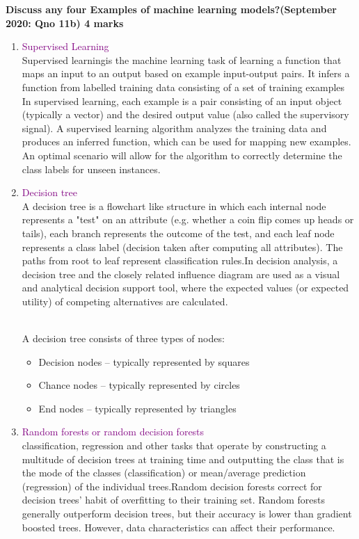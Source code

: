 
\textbf{\textcolor{LightMagenta}{Discuss any four Examples of machine learning models?(September 2020: Qno 11b) \hfill 4 marks}} \\[5pt]
\begin{enumerate}
    \item   
    \textcolor{purple}{Supervised Learning} \\
    Supervised learningis the machine learning task of learning a function that maps an
    input to an output based on example input-output pairs. It infers a function from
    labelled training data consisting of a set of training examples In supervised learning,
    each example is a pair consisting of an input object (typically a vector) and the
    desired output value (also called the supervisory signal). A supervised learning
    algorithm analyzes the training data and produces an inferred function, which can be
    used for mapping new examples. An optimal scenario will allow for the algorithm to
    correctly determine the class labels for unseen instances. 
    
    \item 
    \textcolor{purple}{Decision tree} \\
    A decision tree is a flowchart like structure in which each internal node represents a
    "test" on an attribute (e.g. whether a coin flip comes up heads or tails), each branch
    represents the outcome of the test, and each leaf node represents a class label
    (decision taken after computing all attributes). The paths from root to leaf represent
    classification rules.In decision analysis, a decision tree and the closely related influence
    diagram are used as a visual and analytical decision support tool, where the expected
    values (or expected utility) of competing alternatives are calculated.
    
    \\
    A decision tree consists of three types of nodes:\\
    \begin{itemize}
        \item Decision nodes – typically represented by squares
        \item Chance nodes – typically represented by circles
        \item End nodes – typically represented by triangles
    \end{itemize}
    
    \item 
    \textcolor{purple}{Random forests or random decision forests} \\
    classification, regression and other tasks that operate by constructing a multitude of
    decision trees at training time and outputting the class that is the mode of the classes
    (classification) or mean/average prediction (regression) of the individual trees.Random
    decision forests correct for decision trees' habit of overfitting to their training set.
    Random forests generally outperform decision trees, but their accuracy is lower than
    gradient boosted trees. However, data characteristics can affect their performance.\\
    

\end{enumerate}
